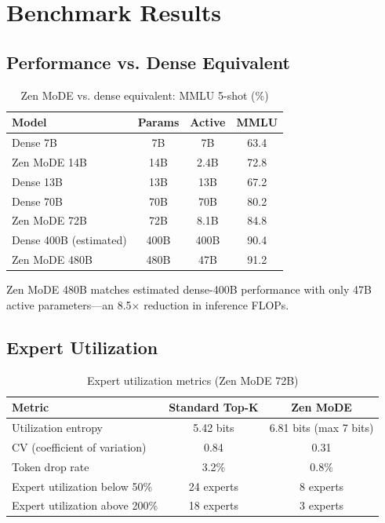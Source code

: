 \documentclass[11pt,a4paper]{article}
\begin{document}
\section{Benchmark Results}

\subsection{Performance vs. Dense Equivalent}

\begin{table}[H]
\centering
\caption{Zen MoDE vs. dense equivalent: MMLU 5-shot (\%)}
\label{tab:perf_dense}
\begin{tabular}{lccc}
\toprule
Model & Params & Active & MMLU \\
\midrule
Dense 7B & 7B & 7B & 63.4 \\
Zen MoDE 14B & 14B & 2.4B & 72.8 \\
Dense 13B & 13B & 13B & 67.2 \\
Dense 70B & 70B & 70B & 80.2 \\
Zen MoDE 72B & 72B & 8.1B & 84.8 \\
Dense 400B (estimated) & 400B & 400B & 90.4 \\
Zen MoDE 480B & 480B & 47B & 91.2 \\
\bottomrule
\end{tabular}
\end{table}

Zen MoDE 480B matches estimated dense-400B performance with only 47B active parameters—an 8.5$\times$ reduction in inference FLOPs.

\subsection{Expert Utilization}

\begin{table}[H]
\centering
\caption{Expert utilization metrics (Zen MoDE 72B)}
\label{tab:utilization}
\begin{tabular}{lcc}
\toprule
Metric & Standard Top-K & Zen MoDE \\
\midrule
Utilization entropy & 5.42 bits & 6.81 bits (max 7 bits) \\
CV (coefficient of variation) & 0.84 & 0.31 \\
Token drop rate & 3.2\% & 0.8\% \\
Expert utilization below 50\% & 24 experts & 8 experts \\
Expert utilization above 200\% & 18 experts & 3 experts \\
\bottomrule
\end{tabular}
\end{table}
\end{document}
